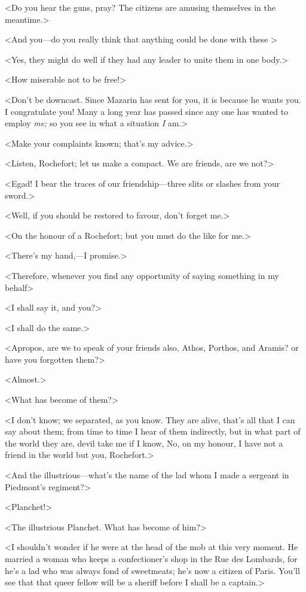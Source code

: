 <Do you hear the guns, pray? The citizens are amusing themselves in the meantime.>

<And you—do you really think that anything could be done with these >

<Yes, they might do well if they had any leader to unite them in one body.>

<How miserable not to be free!>

<Don't be downcast. Since Mazarin has sent for you, it is because he wants you. I congratulate you! Many a long year has passed since any one has wanted to employ \emph{me;} so you see in what a situation \emph{I} am.>

<Make your complaints known; that's my advice.>

<Listen, Rochefort; let us make a compact. We are friends, are we not?>

<Egad! I bear the traces of our friendship—three slits or slashes from your sword.>

<Well, if you should be restored to favour, don't forget me.>

<On the honour of a Rochefort; but you must do the like for me.>

<There's my hand,—I promise.>

<Therefore, whenever you find any opportunity of saying something in my behalf\longdash>

<I shall say it, and you?>

<I shall do the same.>

<Apropos, are we to speak of your friends also, Athos, Porthos, and Aramis? or have you forgotten them?>

<Almost.>

<What has become of them?>

<I don't know; we separated, as you know. They are alive, that's all that I can say about them; from time to time I hear of them indirectly, but in what part of the world they are, devil take me if I know, No, on my honour, I have not a friend in the world but you, Rochefort.>

<And the illustrious—what's the name of the lad whom I made a sergeant in Piedmont's regiment?>

<Planchet!>

<The illustrious Planchet. What has become of him?>

<I shouldn't wonder if he were at the head of the mob at this very moment. He married a woman who keeps a confectioner's shop in the Rue des Lombards, for he's a lad who was always fond of sweetmeats; he's now a citizen of Paris. You'll see that that queer fellow will be a sheriff before I shall be a captain.>

